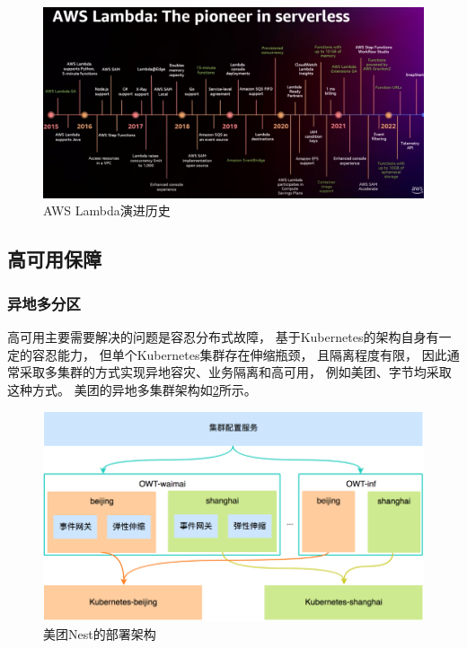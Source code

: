 \begin{figure}[ht!]
    \centering
    \includegraphics[width=\linewidth]{images/lambda_involution.png}
    \caption{AWS Lambda演进历史\cite{aws_lambda_2022}}
    \label{lambda_involution}
\end{figure}



\subsection{高可用保障}

\subsubsection{异地多分区}
高可用主要需要解决的问题是容忍分布式故障，
基于Kubernetes的架构自身有一定的容忍能力，
但单个Kubernetes集群存在伸缩瓶颈\cite{k8s_large_cluster}，
且隔离程度有限，
因此通常采取多集群的方式实现异地容灾、业务隔离和高可用，
例如美团、字节均采取这种方式\cite{meituan_serverless_nest, bytedance_faas}。
美团的异地多集群架构如\cref{nest_arch}所示。

\begin{figure}[ht!]
    \centering
    \includegraphics[width=0.7\linewidth]{images/nest_k8s_arch.png}
    \caption{美团Nest的部署架构}
    \label{nest_arch}
\end{figure}

